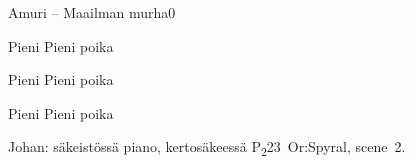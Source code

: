 \documentclass[11pt,a4paper]{article}
\begin{document}
\begin{mysong}{Amuri – Maailman murha}{0}
\begin{SBChorus}
  Pieni     Pieni poika
    
\end{SBChorus}


\begin{SBChorus}
  Pieni     Pieni poika
    
\end{SBChorus}


\begin{SBChorus}
  Pieni     Pieni poika
    
\end{SBChorus}


{\SBLyricNoteFont Johan: säkeistössä piano, kertosäkeessä
P\textsubscript{2}23~Or:Spyral, scene~2.}

\end{mysong}
\end{document}
